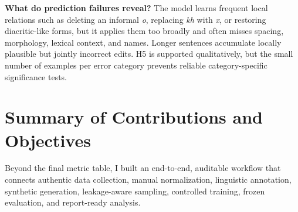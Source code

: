\documentclass[12pt, a4paper, twoside, openany]{report}
\begin{document}
\begin{description}[leftmargin=1.35cm, style=nextline]
	\item[\textbf{RQ5}] \textbf{What do prediction failures reveal?} The model learns frequent local relations such as deleting an informal \textit{o}, replacing \textit{kh} with \textit{x}, or restoring diacritic-like forms, but it applies them too broadly and often misses spacing, morphology, lexical context, and names. Longer sentences accumulate locally plausible but jointly incorrect edits. H5 is supported qualitatively, but the small number of examples per error category prevents reliable category-specific significance tests.
\end{description}


\section{Summary of Contributions and Objectives}

Beyond the final metric table, I built an end-to-end, auditable workflow that connects authentic data collection, manual normalization, linguistic annotation, synthetic generation, leakage-aware sampling, controlled training, frozen evaluation, and report-ready analysis.
\end{document}
